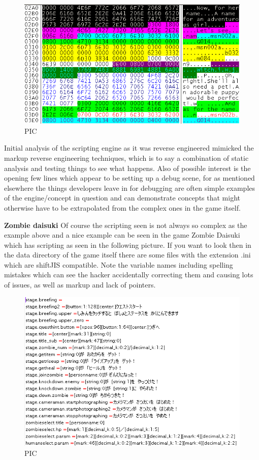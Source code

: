 \documentclass[
]{book}
\begin{document}
\begin{figure}
\centering
\includegraphics{images/125_home_fast6191_romhackingguide_unrenamed_fil___original_borders_romhackguidetextscripting2.png}
\caption{PIC}
\end{figure}

Initial analysis of the scripting engine as it was reverse engineered mimicked the markup reverse engineering techniques, which is to say a combination of static analysis and testing things to see what happens. Also of possible interest is the opening few lines which appear to be setting up a debug scene, for as mentioned elsewhere the things developers leave in for debugging are often simple examples of the engine/concept in question and can demonstrate concepts that might otherwise have to be extrapolated from the complex ones in the game itself.

\textbf{Zombie daisuki} Of course the scripting seen is not always so complex as the example above and a nice example can be seen in the game Zombie Daisuki which has scripting as seen in the following picture. If you want to look then in the data directory of the game itself there are some files with the extension .ini which are shiftJIS compatible. Note the variable names including spelling mistakes which can see the hacker accidentally correcting them and causing lots of issues, as well as markup and lack of pointers.

\begin{figure}
\centering
\includegraphics{images/126_home_fast6191_romhackingguide_unrenamed_fil____borders_romhackingguidescriptingzombiedai1.png}
\caption{PIC}
\end{figure}
\end{document}
